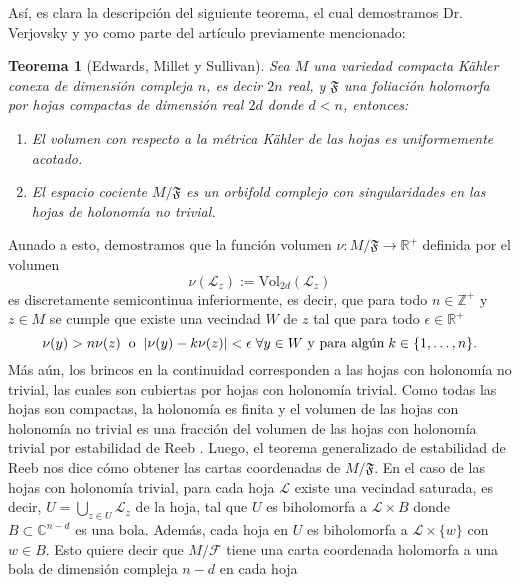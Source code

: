 \documentclass{article}
\newtheorem{teorema}{Teorema}[section]
\newcommand{\zah}{\ensuremath{ \mathbb Z }}
\newcommand{\co}{\ensuremath{\mathbb C }}
\newcommand{\re}{\ensuremath{\mathbb R }}
\begin{document}
\noindent As\'i, es clara la descripci\'on del siguiente teorema, el cual demostramos Dr. Verjovsky y yo como parte del art\'iculo previamente mencionado:
\begin{teorema}[Edwards, Millet y Sullivan]\label{EMS}
        Sea $M$ una variedad compacta K\"ahler conexa de dimensi\'on compleja $n$, es decir $2n$ real, y $\mathfrak{F}$ una foliaci\'on holomorfa por hojas
        compactas de dimensi\'on real $2d$ donde $d<n$, entonces:
        \begin{enumerate}
                \item[a)] El volumen con respecto a la m\'etrica K\"ahler de las hojas es uniformemente acotado.
                \item[b)] El espacio cociente $M/\mathfrak{F}$ es un orbifold complejo con singularidades en las hojas de holonom\'ia no trivial.
        \end{enumerate}
\end{teorema}
Aunado a esto, demostramos que la funci\'on volumen $\nu:M/\mathfrak{F}\rightarrow\re^{+}$ definida por el volumen 
\[
        \nu(\mathcal{L}_z):=\textrm{Vol}_{2d}(\mathcal{L}_z)
\] 
es discretamente semicontinua inferiormente, es decir, que para todo $n\in\zah^{+}$ y $z\in M$ se cumple que existe una vecindad $W$ de $z$
tal que para todo $\epsilon\in\re^{+}$ 
\[
        \nu(y)>n\nu(z)\hspace{0.2cm}\text{o}\hspace{0.2cm}|\nu(y)-k\nu(z)|<\epsilon\hspace{0.1cm}\forall y\in W\text{ y para alg\'un}\hspace{0.1cm}k\in\{1,\dots,n\}.
\]
\noindent M\'as a\'un, los brincos en la continuidad corresponden a las hojas con holonom\'ia no trivial, las cuales son cubiertas
por hojas con holonom\'ia trivial. Como todas las hojas son compactas, la holonom\'ia es finita y el volumen de las hojas
con holonom\'ia no trivial es una fracci\'on del volumen de las hojas con holonom\'ia trivial por estabilidad de Reeb \cite{Thurston}. 
Luego, el teorema generalizado de estabilidad de Reeb \cite{Thurston} nos dice c\'omo obtener las cartas coordenadas de $M/\mathfrak{F}$. 
En el caso de las hojas con holonom\'ia trivial, para cada hoja $\mathcal{L}$ existe una vecindad saturada, es decir, $U=\bigcup_{z\in U}\mathcal{L}_z$ de la hoja, 
tal que $U$ es biholomorfa a $\mathcal{L}\times B$ donde $B\subset\co^{n-d}$ es una bola. Adem\'as, cada hoja en $U$ es biholomorfa a $\mathcal{L}\times\{w\}$ con $w\in B$. 
Esto quiere decir que $M/\mathcal{F}$ tiene una carta coordenada holomorfa a una bola de dimensi\'on compleja $n-d$ en cada hoja 
\end{document}
